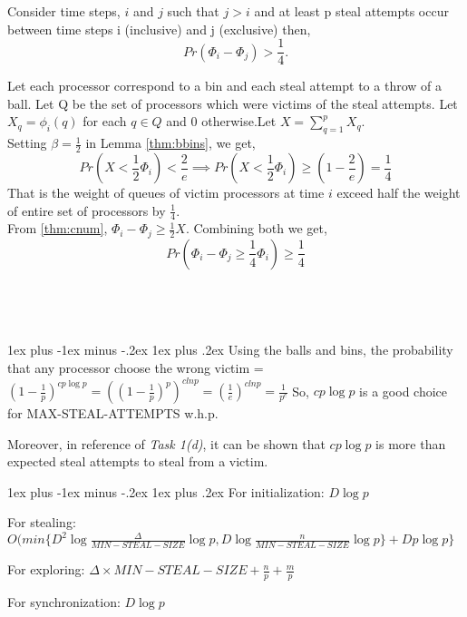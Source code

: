 \documentclass[11pt]{article}
\makeatletter
\renewcommand{\subsection}{\@startsection{subsection}{2}{0mm}%
                                     {1ex plus -1ex minus -.2ex}%
                                     {1ex plus .2ex}%
                                     {\normalfont\large\bfseries}}%
\makeatother
\begin{document}
Consider time steps, $i$ and $j$ such that $j > i$ and at least p steal attempts occur between time steps i (inclusive) and j (exclusive) then,
\[
Pr \left( \Phi_i - \Phi_j \right)  > \frac {1}{4}.
\]
\label{thm:phases}


Let each processor correspond to a bin and each steal attempt to a throw of a ball. Let Q be the set of processors which were victims of the steal attempts. Let $X_q = \phi_i(q)$ for each $q \in Q$ and $0$ otherwise.Let  $X = \sum \limits_{q=1}^p X_q$.\\
Setting $\beta = \frac {1}{2}$ in Lemma \ref{thm:bbins}, we get,
\[
Pr \left( X < \frac{1}{2} \Phi_i \right) < \frac {2}{e} \implies Pr \left( X < \frac{1}{2} \Phi_i \right) \ge \left( 1 - \frac {2}{e} \right) = \frac {1}{4}
\]
That is the weight of queues of victim processors at time $i$ exceed half the weight of entire set of processors by $\frac {1}{4}$.\\
From \ref{thm:cnum}, $\Phi_i - \Phi_j \ge \frac{1}{2} X$. Combining both we get,
\[
Pr \left( \Phi_i - \Phi_j \ge \frac {1}{4} \Phi_i \right) \ge  \frac {1}{4}
\]\\\\\\\\





\subsection{}
Using the balls and bins, the probability that any processor choose the wrong victim = ${(1-\frac{1}{p})}^{cp \log p} = {({(1-\frac{1}{p})}^p)}^{clnp} = {(\frac{1}{e})}^{clnp} = \frac{1}{p^c}$
So, $cp\log p$ is a good choice for MAX-STEAL-ATTEMPTS w.h.p. 

Moreover, in reference of {\it Task 1(d)}, it can be shown that  $cp \log p$ is more than expected steal attempts to steal from a victim.

\subsection{}
For initialization: $D \log p$

For stealing: $O(min \{ D^2 \log \frac {\Delta}{MIN-STEAL-SIZE} \log p, D \log \frac {n}{MIN-STEAL-SIZE} \log p \} + D p \log p \}$

For exploring: $\Delta \times MIN-STEAL-SIZE + \frac{n}{p} + \frac{m}{p}$

For synchronization: $D \log p$
\end{document}
